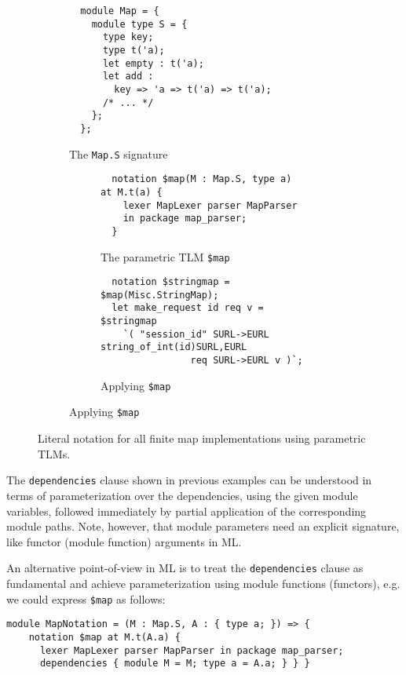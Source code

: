 \documentclass[acmsmall]{acmart}
\newcommand{\li}[1]{\lstinline[basicstyle=\ttfamily\fontsize{9pt}{1em}\selectfont]{#1}}
\begin{document}
\begin{figure}
\begin{subfigure}[t]{0.4\textwidth}
\begin{lstlisting}
  module Map = { 
    module type S = {
      type key;
      type t('a);
      let empty : t('a);
      let add : 
        key => 'a => t('a) => t('a);
      /* ... */
    };
  };
\end{lstlisting}
\vspace{-7px}
\caption{The \li{Map.S} signature}
\label{fig:map-sig}
\end{subfigure}
\hfill
\begin{subfigure}[t]{0.55\textwidth}
\begin{subfigure}[t]{\textwidth}
\begin{lstlisting}
  notation $map(M : Map.S, type a) at M.t(a) {
    lexer MapLexer parser MapParser 
    in package map_parser;
  }
\end{lstlisting}
\vspace{-8px}
\caption{The parametric TLM \li{$map}}
\vspace{5px}
\label{fig:map-tlm}
\end{subfigure}
\begin{subfigure}[b]{\textwidth}
\begin{lstlisting}
  notation $stringmap = $map(Misc.StringMap);
  let make_request id req v = $stringmap
    `( "session_id" SURL->EURL string_of_int(id)SURL,EURL
                req SURL->EURL v )`;
\end{lstlisting}
\vspace{-4px}
\caption{Applying \li{$map}}
\label{fig:map-ap}
\end{subfigure}
\end{subfigure}
\vspace{4px}
\caption{Literal notation for all finite map implementations using parametric TLMs.}
\vspace{-5px}
\label{fig:map-fig}
\end{figure}

The \li{dependencies} clause shown in previous examples can be understood in terms of parameterization over the dependencies, using the given module variables, followed immediately by partial application of the corresponding module paths. Note, however, that module parameters need an explicit signature, like functor (module function) arguments in ML.

An alternative point-of-view in ML is to treat the \li{dependencies} clause as fundamental and achieve parameterization using module functions (functors), e.g. we could express \li{$map} as follows:
\begin{lstlisting}[numbers=none]
  module MapNotation = (M : Map.S, A : { type a; }) => {
    notation $map at M.t(A.a) { 
      lexer MapLexer parser MapParser in package map_parser;
      dependencies { module M = M; type a = A.a; } } }
\end{lstlisting}
\end{document}
